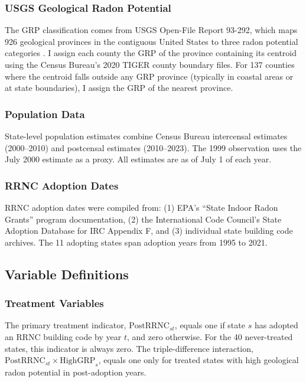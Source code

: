 \documentclass[12pt]{article}
\begin{document}
\subsubsection*{USGS Geological Radon Potential} The GRP classification comes from USGS Open-File Report 93-292, which maps 926 geological provinces in the contiguous United States to three radon potential categories \citep{gundersen1993geologic}. I assign each county the GRP of the province containing its centroid using the Census Bureau's 2020 TIGER county boundary files. For 137 counties where the centroid falls outside any GRP province (typically in coastal areas or at state boundaries), I assign the GRP of the nearest province.

\subsubsection*{Population Data} State-level population estimates combine Census Bureau intercensal estimates (2000--2010) and postcensal estimates (2010--2023). The 1999 observation uses the July 2000 estimate as a proxy. All estimates are as of July 1 of each year.

\subsubsection*{RRNC Adoption Dates} RRNC adoption dates were compiled from: (1) EPA's ``State Indoor Radon Grants'' program documentation, (2) the International Code Council's State Adoption Database for IRC Appendix F, and (3) individual state building code archives. The 11 adopting states span adoption years from 1995 to 2021.

\subsection{Variable Definitions}

\subsubsection*{Treatment Variables} The primary treatment indicator, $\text{PostRRNC}_{st}$, equals one if state $s$ has adopted an RRNC building code by year $t$, and zero otherwise. For the 40 never-treated states, this indicator is always zero. The triple-difference interaction, $\text{PostRRNC}_{st} \times \text{HighGRP}_s$, equals one only for treated states with high geological radon potential in post-adoption years.
\end{document}
